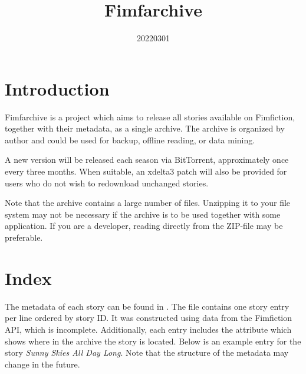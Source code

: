 \documentclass[hidelinks,a4paper,12pt]{article}
\begin{document}
\title{Fimfarchive}
\date{20220301}

\maketitle
\newpage
\tableofcontents
\newpage

\section{Introduction} \label{sec:introduction}

Fimfarchive is a project which aims to release all stories available on Fimfiction, together with their metadata, as a single archive. The archive is organized by author and could be used for backup, offline reading, or data mining.

A new version will be released each season via BitTorrent, approximately once every three months. When suitable, an xdelta3 patch will also be provided for users who do not wish to redownload unchanged stories.

Note that the archive contains a large number of files. Unzipping it to your file system may not be necessary if the archive is to be used together with some application. If you are a developer, reading directly from the ZIP-file may be preferable.


\section{Index} \label{sec:index}

The metadata of each story can be found in . The file contains one story entry per line ordered by story ID. It was constructed using data from the Fimfiction API, which is incomplete. Additionally, each entry includes the attribute  which shows where in the archive the story is located. Below is an example entry for the story \emph{Sunny Skies All Day Long}. Note that the structure of the metadata may change in the future.
\end{document}
